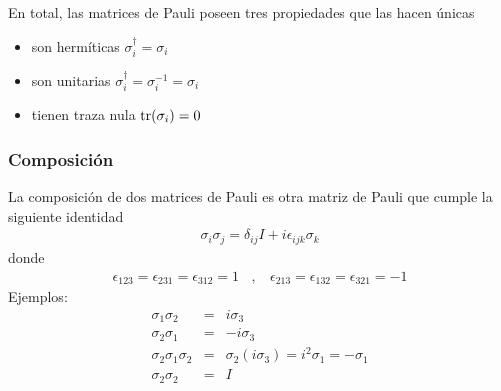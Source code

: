 \documentclass[letterpaper,10pt,english]{jupyterBook}
\newcommand{\tr}{{\rm tr}}
\begin{document}
\sphinxAtStartPar
En total,  las matrices de Pauli poseen tres propiedades que las hacen únicas
\begin{itemize}
\item {} 
\sphinxAtStartPar
son hermíticas \(\sigma_i^\dagger = \sigma_i\)

\item {} 
\sphinxAtStartPar
son unitarias \(\sigma_i^\dagger = \sigma_i^{-1} = \sigma_i\)

\item {} 
\sphinxAtStartPar
tienen traza nula \(\tr(\sigma_i) = 0\)

\end{itemize}


\subsubsection{Composición}
\label{\detokenize{docs/Part_01_Formalismo/Chapter_01_02_Formalismo_matem_xe1tico/01_03_Operadores_myst:composicion}}
\sphinxAtStartPar
La composición de dos matrices de Pauli es otra matriz de Pauli que cumple la siguiente identidad
\begin{equation*}
\begin{split}
\sigma_i \sigma_j = \delta_{ij}I + i\epsilon_{ijk}  \sigma_k
\end{split}
\end{equation*}
\sphinxAtStartPar
donde
\begin{equation*}
\begin{split}
\epsilon_{123} = \epsilon_{231}=\epsilon_{312}=1~~~~,~~~~\epsilon_{213} = \epsilon_{132}=\epsilon_{321}=-1
\end{split}
\end{equation*}
\sphinxAtStartPar
Ejemplos:
\begin{eqnarray*}
\sigma_1\sigma_2 &=& i \sigma_3  \\
\sigma_2\sigma_1 &=& -i \sigma_3  \\
\sigma_2\sigma_1\sigma_2 &=& \sigma_2(i\sigma_3) = i^2 \sigma_1 = -\sigma_1\\
\sigma_2\sigma_2 &=& I
\end{eqnarray*}
\end{document}
